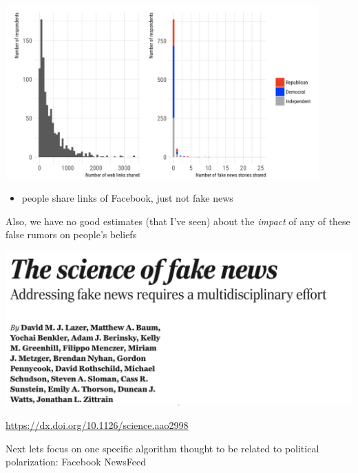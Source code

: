 \documentclass[aspectratio=169]{beamer}
\begin{document}
\begin{frame} 

\begin{center}
\includegraphics[width=0.9\textwidth]{figures/guess_less_2019_fig1}
\end{center}

\begin{itemize}
\item people share links of Facebook, just not fake news
\end{itemize}

\end{frame}
\begin{frame} 

Also, we have no good estimates (that I've seen) about the \emph{impact} of any of these false rumors on people's beliefs

\end{frame}
\begin{frame}

\begin{center}
\includegraphics[width=\textwidth]{figures/lazer_science_2018_title}
\end{center}

\url{https://dx.doi.org/10.1126/science.aao2998}

\end{frame}
\begin{frame}

Next lets focus on one specific algorithm thought to be related to political polarization: Facebook NewsFeed

\end{frame}
\end{document}
